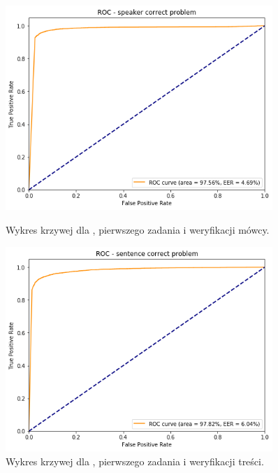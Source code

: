 \begin{figure}[H]
    \centering
    \begin{minipage}{.5\textwidth}
        \centering
        \includegraphics[width=0.9\textwidth]{images/4_3_gmm_roc_speaker}
        \caption{Wykres krzywej  dla , pierwszego zadania  i weryfikacji mówcy.}
        \label{fig:4_3_gmm_roc_speaker}
    \end{minipage}%
    \begin{minipage}{.5\textwidth}
        \centering
        \includegraphics[width=0.9\textwidth]{images/4_3_gmm_roc_sentence}
        \caption{Wykres krzywej  dla , pierwszego zadania  i weryfikacji treści.}
        \label{fig:4_3_gmm_roc_sentence}
    \end{minipage}
\end{figure}

